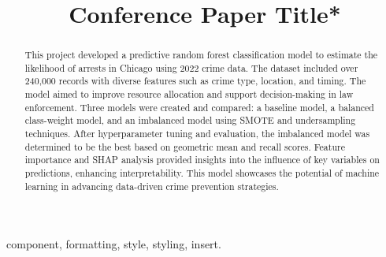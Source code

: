 \documentclass[conference]{IEEEtran}
\begin{document}
\title{Conference Paper Title*\\
}

\author{
\and
{}
\and
{}
}

\maketitle

\begin{abstract}
This project developed a predictive random forest classification model to estimate the likelihood of arrests in Chicago using 2022 crime data. The dataset included over 240,000 records with diverse features such as crime type, location, and timing. The model aimed to improve resource allocation and support decision-making in law enforcement. Three models were created and compared: a baseline model, a balanced class-weight model, and an imbalanced model using SMOTE and undersampling techniques. After hyperparameter tuning and evaluation, the imbalanced model was determined to be the best based on geometric mean and recall scores. Feature importance and SHAP analysis provided insights into the influence of key variables on predictions, enhancing interpretability. This model showcases the potential of machine learning in advancing data-driven crime prevention strategies.
\end{abstract}

\begin{IEEEkeywords}
component, formatting, style, styling, insert.
\end{IEEEkeywords}
\end{document}

